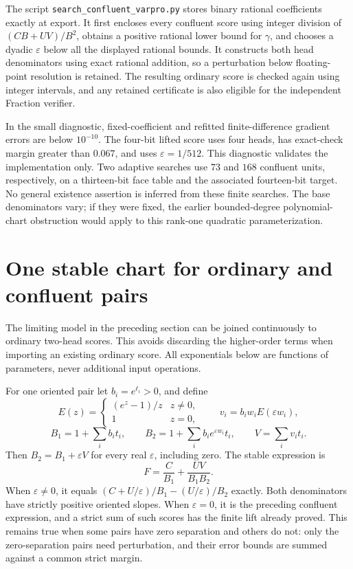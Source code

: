 \documentclass[11pt]{article}
\begin{document}
The script \texttt{search\_confluent\_varpro.py} stores binary rational
coefficients exactly at export. It first encloses every confluent score
using integer division of $(CB+UV)/B^2$, obtains a positive rational
lower bound for $\gamma$, and chooses a dyadic $\varepsilon$ below
all the displayed rational bounds. It constructs both head denominators
using exact rational addition, so a perturbation below floating-point
resolution is retained. The resulting ordinary score is checked again
using integer intervals, and any retained certificate is also eligible
for the independent Fraction verifier.

In the small diagnostic, fixed-coefficient and refitted finite-difference
gradient errors are below $10^{-10}$. The four-bit lifted score uses four
heads, has exact-check margin greater than $0.067$, and uses
$\varepsilon=1/512$. This diagnostic validates the implementation only.
Two adaptive searches use $73$ and $168$ confluent units, respectively,
on a thirteen-bit face table and the associated fourteen-bit target.
No general existence assertion is inferred from these finite searches.
The base denominators vary; if they were fixed, the earlier bounded-degree
polynomial-chart obstruction would apply to this rank-one quadratic
parameterization.


\section{One stable chart for ordinary and confluent pairs}

The limiting model in the preceding section can be joined continuously
to ordinary two-head scores. This avoids discarding the higher-order
terms when importing an existing ordinary score. All exponentials below
are functions of parameters, never additional input operations.

For one oriented pair let $b_i=e^{\ell_i}>0$, and define
\[
 E(z)=\begin{cases}(e^z-1)/z&z\ne0,\\1&z=0,\end{cases}
 \qquad v_i=b_iw_iE(\varepsilon w_i),
\]
\[
 B_1=1+\sum_i b_it_i,\qquad
 B_2=1+\sum_i b_ie^{\varepsilon w_i}t_i,\qquad V=\sum_i v_it_i.
\]
Then $B_2=B_1+\varepsilon V$ for every real $\varepsilon$, including
zero. The stable expression is
\[
 F=\frac C{B_1}+\frac{UV}{B_1B_2}.
\]
When $\varepsilon\ne0$, it equals
$(C+U/\varepsilon)/B_1-(U/\varepsilon)/B_2$ exactly. Both
denominators have strictly positive oriented slopes. When
$\varepsilon=0$, it is the preceding confluent expression, and a strict
sum of such scores has the finite lift already proved. This remains
true when some pairs have zero separation and others do not: only the
zero-separation pairs need perturbation, and their error bounds are
summed against a common strict margin.
\end{document}
